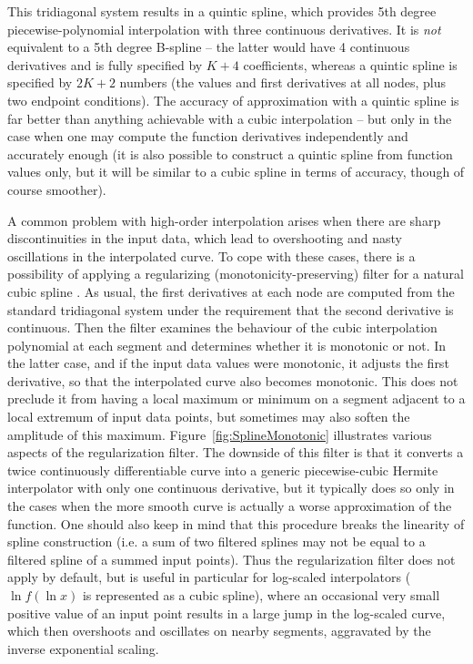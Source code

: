 \documentclass[12pt]{article}
\begin{document}
This tridiagonal system results in a quintic spline, which provides 5th degree piecewise-polynomial interpolation with three continuous derivatives. It is \textit{not} equivalent to a 5th degree B-spline -- the latter would have 4 continuous derivatives and is fully specified by $K+4$ coefficients, whereas a quintic spline is specified by $2K+2$ numbers (the values and first derivatives at all nodes, plus two endpoint conditions). The accuracy of approximation with a quintic spline is far better than anything achievable with a cubic interpolation -- but only in the case when one may compute the function derivatives independently and accurately enough (it is also possible to construct a quintic spline from function values only, but it will be similar to a cubic spline in terms of accuracy, though of course smoother).

A common problem with high-order interpolation arises when there are sharp discontinuities in the input data, which lead to overshooting and nasty oscillations in the interpolated curve. To cope with these cases, there is a possibility of applying a regularizing (monotonicity-preserving) filter for a natural cubic spline \cite{Hyman}. As usual, the first derivatives at each node are computed from the standard tridiagonal system under the requirement that the second derivative is continuous. Then the filter examines the behaviour of the cubic interpolation polynomial at each segment and determines whether it is monotonic or not. In the latter case, and if the input data values were monotonic, it adjusts the first derivative, so that the interpolated curve also becomes monotonic. This does not preclude it from having a local maximum or minimum on a segment adjacent to a local extremum of input data points, but sometimes may also soften the amplitude of this maximum. Figure~\ref{fig:SplineMonotonic} illustrates various aspects of the regularization filter. The downside of this filter is that it converts a twice continuously differentiable curve into a generic piecewise-cubic Hermite interpolator with only one continuous derivative, but it typically does so only in the cases when the more smooth curve is actually a worse approximation of the function. One should also keep in mind that this procedure breaks the linearity of spline construction (i.e. a sum of two filtered splines may not be equal to a filtered spline of a summed input points). Thus the regularization filter does not apply by default, but is useful in particular for log-scaled interpolators ($\ln f(\ln x)$ is represented as a cubic spline), where an occasional very small positive value of an input point results in a large jump in the log-scaled curve, which then overshoots and oscillates on nearby segments, aggravated by the inverse exponential scaling.
\end{document}
